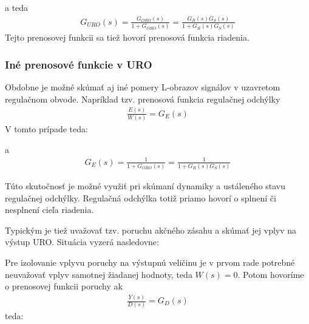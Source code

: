 \documentclass[a4paper, 10pt, ]{article}
\begin{document}
\noindent
a teda
\begin{align}
    G_{URO}(s) = \frac{G_{ORO}(s)}{1+G_{ORO}(s)} = \frac{G_R(s) G_S(s)}{1 + G_R(s) G_S(s)}
\end{align}
Tejto prenosovej funkcii sa tiež hovorí prenosová funkcia riadenia.



\subsubsection{Iné prenosové funkcie v URO}

Obdobne je možné skúmať aj iné pomery L-obrazov signálov v uzavretom regulačnom obvode. Napríklad tzv. prenosová funkcia regulačnej odchýlky
\begin{align}
    \frac{E(s)}{W(s)} = G_E(s)
\end{align}
V tomto prípade teda:

\begin{center}


	\figcaption{}
	\label{schLinURO_GE.pdf}

\end{center}

\noindent
a
\begin{align}
    G_E(s) = \frac{1}{1+G_{ORO}(s)} = \frac{1}{1 + G_R(s) G_S(s)}
\end{align}

Túto skutočnosť je možné využiť pri skúmaní dynamiky a ustáleného stavu regulačnej odchýlky. Regulačná odchýlka totiž priamo hovorí o splnení či nesplnení cieľa riadenia.

Typickým je tiež uvažovať tzv. poruchu akčného zásahu a skúmať jej vplyv na výstup URO. Situácia vyzerá nasledovne:

\begin{center}


	\label{schLinURO_basic_porucha.pdf}

\end{center}

Pre izolovanie vplyvu poruchy na výstupnú veličinu je v prvom rade potrebné neuvažovať vplyv samotnej žiadanej hodnoty, teda $W(s) = 0$. Potom hovoríme o prenosovej funkcii poruchy ak
\begin{align}
    \frac{Y(s)}{D(s)} = G_D(s)
\end{align}
teda:
\end{document}

